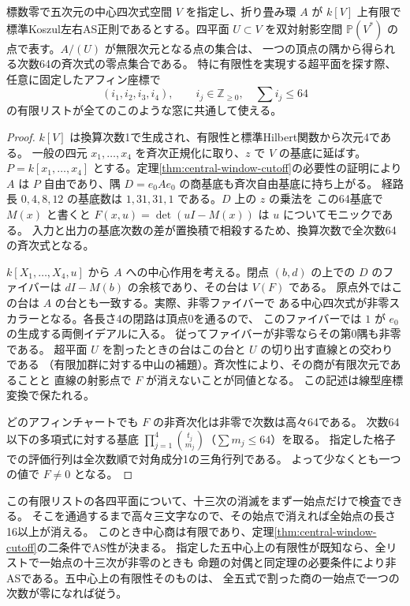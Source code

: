 \begin{proposition}\label{prop:five-center-bad-hypersurface}
標数零で五次元の中心四次式空間 $V$ を指定し、折り畳み環 $A$ が $k[V]$ 上有限で
標準Koszul左右AS正則であるとする。四平面 $U\subset V$ を双対射影空間
$\mathbb P(V^*)$ の点で表す。$A/(U)$ が無限次元となる点の集合は、
一つの頂点の隅から得られる次数64の斉次式の零点集合である。
特に有限性を実現する超平面を探す際、任意に固定したアフィン座標で
\[
 (i_1,i_2,i_3,i_4),\qquad i_j\in\mathbb Z_{\ge0},\quad \sum i_j\le64
\]
の有限リストが全てのこのような窓に共通して使える。
\end{proposition}
\begin{proof}
$k[V]$ は換算次数1で生成され、有限性と標準Hilbert関数から次元4である。
一般の四元 $x_1,\ldots,x_4$ を斉次正規化に取り、$z$ で $V$ の基底に延ばす。
$P=k[x_1,\ldots,x_4]$ とする。定理\ref{thm:central-window-cutoff}の必要性の証明により
$A$ は $P$ 自由であり、隅 $D=e_0 A e_0$ の商基底も斉次自由基底に持ち上がる。
経路長 $0,4,8,12$ の基底数は $1,31,31,1$ である。$D$ 上の $z$ の乗法を
この64基底で $M(x)$ と書くと $F(x,u)=\det(uI-M(x))$ は $u$ についてモニックである。
入力と出力の基底次数の差が置換積で相殺するため、換算次数で全次数64の斉次式となる。

$k[X_1,\ldots,X_4,u]$ から $A$ への中心作用を考える。閉点 $(b,d)$ の上での
$D$ のファイバーは $dI-M(b)$ の余核であり、その台は $V(F)$ である。
原点外ではこの台は $A$ の台とも一致する。実際、非零ファイバーで
ある中心四次式が非零スカラーとなる。各長さ4の閉路は頂点0を通るので、
このファイバーでは $1$ が $e_0$ の生成する両側イデアルに入る。
従ってファイバーが非零ならその第0隅も非零である。
超平面 $U$ を割ったときの台はこの台と $U$ の切り出す直線との交わりである
（有限加群に対する中山の補題）。斉次性により、その商が有限次元であることと
直線の射影点で $F$ が消えないことが同値となる。
この記述は線型座標変換で保たれる。

どのアフィンチャートでも $F$ の非斉次化は非零で次数は高々64である。
次数64以下の多項式に対する基底
$\prod_{j=1}^4\binom{t_j}{m_j}$（$\sum m_j\le64$）を取る。
指定した格子での評価行列は全次数順で対角成分1の三角行列である。
よって少なくとも一つの値で $F\ne0$ となる。
\end{proof}

この有限リストの各四平面について、十三次の消滅をまず一始点だけで検査できる。
そこを通過するまで高々三文字なので、その始点で消えれば全始点の長さ16以上が消える。
このとき中心商は有限であり、定理\ref{thm:central-window-cutoff}の二条件でAS性が決まる。
指定した五中心上の有限性が既知なら、全リストで一始点の十三次が非零のときも
命題の対偶と同定理の必要条件により非ASである。五中心上の有限性そのものは、
全五式で割った商の一始点で一つの次数が零になれば従う。

